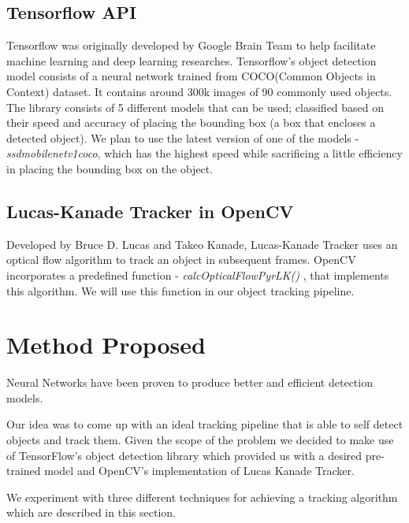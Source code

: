 \documentclass[10pt,twocolumn,letterpaper]{article}
\begin{document}
\subsection{Tensorflow API}

Tensorflow was originally developed by Google Brain Team to help facilitate machine learning and deep learning researches. Tensorflow's object detection model consists of a neural network trained from COCO(Common Objects in Context) dataset. It contains around 300k images of 90 commonly used objects. The library consists of 5 different models that can be used; classified based on their speed and accuracy of placing the bounding box (a box that encloses a detected object). We plan to use the latest version of one of the models - \textit{ssd\textunderscore mobilenet\textunderscore v1\textunderscore coco}, which has the highest speed while sacrificing a little efficiency in placing the bounding box on the object.

\subsection{Lucas-Kanade Tracker in OpenCV}

Developed by Bruce D. Lucas and Takeo Kanade, Lucas-Kanade Tracker uses an optical flow algorithm to track an object in subsequent frames. OpenCV incorporates a predefined function - \textit{calcOpticalFlowPyrLK()} , that implements this algorithm. We will use this function in our object tracking pipeline.





\section{Method Proposed}
Neural Networks have been proven to produce better and efficient detection models. 

Our idea was to come up with an ideal tracking pipeline that is able to self detect objects and track them. Given the scope of the problem we decided to make use of TensorFlow's object detection library which provided us with a desired pre-trained model and OpenCV's implementation of Lucas Kanade Tracker.  

We experiment with three different techniques for achieving a tracking algorithm which are described in this section.
\end{document}
